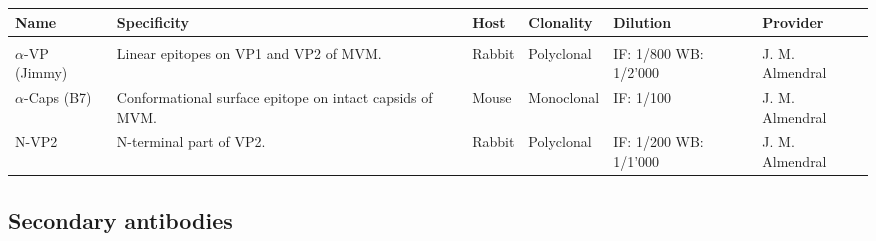 \begin{small}
\begin{center}
\begin{tabulary}{1\textwidth}{ P{2 cm} p{5cm} l l P{2 cm} p{3 cm}}

\textbf{Name} & \textbf{Specificity } & \textbf{Host} & \textbf{Clonality} & \textbf{Dilution} & \textbf{Provider}\\
\hline
\\
$\alpha$-VP (Jimmy) & Linear epitopes on VP1 and VP2 of MVM. & Rabbit & Polyclonal & IF: 1/800 WB: 1/2'000  & J. M. Almendral\\
$\alpha$-Caps \newline(B7) & Conformational surface epitope on intact capsids of MVM. & Mouse & Monoclonal & IF: 1/100 & J. M. Almendral \\
N-VP2 & N-terminal part of VP2. & Rabbit & Polyclonal & IF: 1/200 WB: 1/1'000 & J. M. Almendral\\
  

\end{tabulary}
\end{center}
\end{small}


\subsection{Secondary antibodies}

